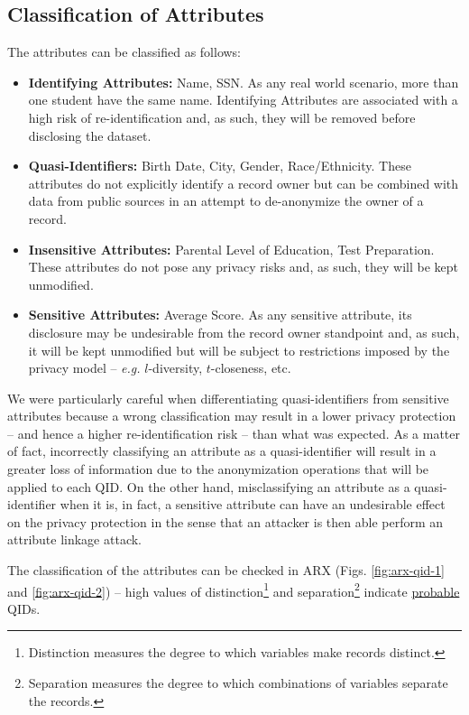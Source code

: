 \documentclass[a4paper, 11pt]{article}
\begin{document}
\pagebreak

\subsection{Classification of Attributes}

The attributes can be classified as follows:

\begin{itemize}
    \item \textbf{Identifying Attributes:} Name, SSN. As any real world 
    scenario, more than one student have the same name. Identifying Attributes
    are associated with a high risk of re-identification and, as such, they will
    be removed before disclosing the dataset.
    \item \textbf{Quasi-Identifiers:} Birth Date, City, Gender, Race/Ethnicity.
    These attributes do not explicitly identify a record owner but can be combined 
    with data from public sources in an attempt to de-anonymize the owner of a 
    record.
    \item \textbf{Insensitive Attributes:} Parental Level of Education, Test 
    Preparation. These attributes do not pose any privacy risks and, as such, they 
    will be kept unmodified.
    \item \textbf{Sensitive Attributes:} Average Score. As any sensitive 
    attribute, its disclosure may be undesirable from the record owner standpoint 
    and, as such, it will be kept unmodified but will be subject to restrictions 
    imposed by the privacy model -- \textit{e.g.} $l$-diversity, $t$-closeness, etc.
\end{itemize}

\vspace{\baselineskip}

We were particularly careful when differentiating quasi-identifiers from 
sensitive attributes because a wrong classification may result in a lower 
privacy protection -- and hence a higher re-identification risk -- than what 
was expected. As a matter of fact, incorrectly classifying an attribute as a 
quasi-identifier will result in a greater loss of information due to the 
anonymization operations that will be applied to each QID. On the other hand, 
misclassifying an attribute as a quasi-identifier when it is, in fact, a 
sensitive attribute can have an undesirable effect on the privacy protection in 
the sense that an attacker is then able perform an attribute linkage attack.

The classification of the attributes can be checked in ARX (Figs. 
\ref{fig:arx-qid-1} and \ref{fig:arx-qid-2}) -- high values of 
distinction\footnote{Distinction measures the degree to which variables make 
records distinct.} and separation\footnote{Separation measures the degree to 
which combinations of variables separate the records.} indicate 
\uline{probable} QIDs.
\end{document}
